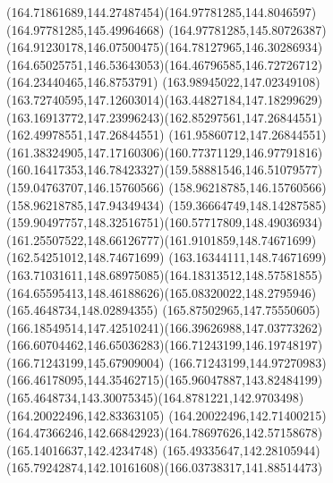 \documentclass{article}
\begin{document}
{{\curveto(164.71861689,144.27487454)(164.97781285,144.8046597)(164.97781285,145.49964668)
\curveto(164.97781285,145.80726387)(164.91230178,146.07500475)(164.78127965,146.30286934)
\curveto(164.65025751,146.53643053)(164.46796585,146.72726712)(164.23440465,146.8753791)
\curveto(163.98945022,147.02349108)(163.72740595,147.12603014)(163.44827184,147.18299629)
\curveto(163.16913772,147.23996243)(162.85297561,147.26844551)(162.49978551,147.26844551)
\curveto(161.95860712,147.26844551)(161.38324905,147.17160306)(160.77371129,146.97791816)
\curveto(160.16417353,146.78423327)(159.58881546,146.51079577)(159.04763707,146.15760566)
\lineto(158.96218785,146.15760566)
\lineto(158.96218785,147.94349434)
\curveto(159.36664749,148.14287585)(159.90497757,148.32516751)(160.57717809,148.49036934)
\curveto(161.25507522,148.66126777)(161.9101859,148.74671699)(162.54251012,148.74671699)
\curveto(163.16344111,148.74671699)(163.71031611,148.68975085)(164.18313512,148.57581855)
\curveto(164.65595413,148.46188626)(165.08320022,148.2795946)(165.4648734,148.02894355)
\curveto(165.87502965,147.75550605)(166.18549514,147.42510241)(166.39626988,147.03773262)
\curveto(166.60704462,146.65036283)(166.71243199,146.19748197)(166.71243199,145.67909004)
\curveto(166.71243199,144.97270983)(166.46178095,144.35462715)(165.96047887,143.82484199)
\curveto(165.4648734,143.30075345)(164.8781221,142.9703498)(164.20022496,142.83363105)
\lineto(164.20022496,142.71400215)
\curveto(164.47366246,142.66842923)(164.78697626,142.57158678)(165.14016637,142.4234748)
\curveto(165.49335647,142.28105944)(165.79242874,142.10161608)(166.03738317,141.88514473)
\closepath
}
}
{
}
{
}
\end{document}

